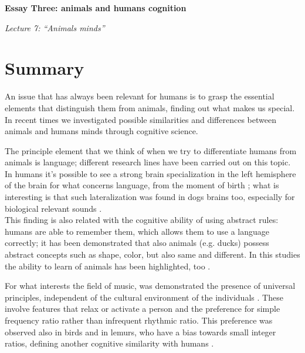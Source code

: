 \begin{flushleft}
    {\fontsize{16}{18}\selectfont\textbf{Essay Three: animals and humans cognition}} 

    \bigskip

    {\fontsize{14}{16}\selectfont \textit{Lecture 7: “Animals minds”}}
\end{flushleft}

\section*{Summary}
An issue that has always been relevant for humans is to grasp the essential elements that distinguish them from animals, finding out what makes us special. In recent times we investigated possible similarities and differences between animals and humans minds through cognitive science. 

The principle element that we think of when we try to differentiate humans from animals is language; different research lines have been carried out on this topic.\\
In humans it's possible to see a strong brain specialization in the left hemisphere of the brain for what concerns language, from the moment of birth \parencite{Pena_2003}; what is interesting is that such lateralization was found in dogs brains too, especially for biological relevant sounds \parencite{Andics_2016}. \\ 
This finding is also related with the cognitive ability of using abstract rules: humans are able to remember them, which allows them to use a language correctly; it has been demonstrated that also animals (e.g. ducks) possess abstract concepts such as shape, color, but also same and different. In this studies the ability to learn of animals has been highlighted, too \parencite{Martinho_2016}. 

For what interests the field of music, was demonstrated the presence of universal principles, independent of the cultural environment of the individuals \parencite{Mehr_2019}. 
These involve features that relax or activate a person and the preference for simple frequency ratio rather than infrequent rhythmic ratio. This preference was observed also in birds \parencite{Doolittle_2014} and in lemurs, who have a bias towards small integer ratios, defining another cognitive similarity with humans \parencite{Degregorio_2021}.

